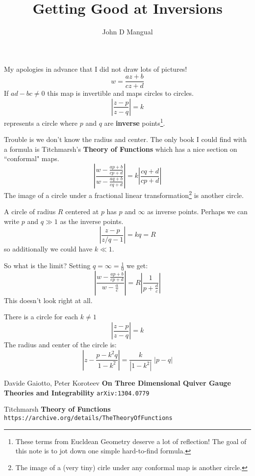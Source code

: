 \documentclass[12pt]{article}
\title{\textbf{ Getting Good at Inversions }}
\author{John D Mangual}
\date{}
\begin{document}
\selectfont \fontsize{25}{30}\selectfont

\maketitle

\noindent My apologies in advance that I did not draw lots of pictures!
$$ w = \frac{az+b}{cz+d} $$
If $ad-bc \neq 0$ this map is invertible and maps circles to circles.
$$ \left|\frac{z-p}{z-q}\right| = k $$
represents a circle where $p$ and $q$ are \textbf{inverse} points\footnote{These terms from Eucldean Geometry deserve a lot of reflection! The goal of this note is to jot down one simple hard-to-find formula.}.

\newpage

\noindent Trouble is we don't know the radius and center.  The only book I could find with a formula is Titchmarsh's \textbf{Theory of Functions} which has a nice section on ``conformal" maps. 
$$ \left| \frac{w - \frac{ap+b}{cp+d}}{w - \frac{aq+b}{cq+d}} \right| = k \left| \frac{cq + d}{cp + d} \right| $$
The image of a circle under a fractional linear transformation\footnote{The image of a (very tiny) cirle under any conformal map is another circle.} is another circle. \newline

\noindent A circle of radius $R$ centered at $p$ has $p$ and $\infty$ as inverse points.  Perhaps we can write $p$ and $q \gg 1 $ as the inverse points.
$$ \left|\frac{z-p}{z/q-1}\right| = kq= R $$
so additionally we could have $k \ll 1$.

\newpage

\noindent So what is the limit?  Setting $q = \infty = \frac{1}{0}$ we get:
$$ \left| \frac{w - \frac{ap+b}{cp+d}}{w - \frac{a}{c}} \right| = R\left| \frac{1}{p + \frac{d}{c}} \right| $$
This doesn't look right at all. \newline

\noindent There is a circle for each $k \neq 1$
$$ \left|\frac{z-p}{z-q}\right| = k $$
The radius and center of the circle is:
$$ \left|z - \frac{p - k^2 q}{1 - k^2} \right| = \frac{k}{|1 - k^2|} \; |p - q|$$

\newpage

\selectfont \fontsize{12}{10}\selectfont

\begin{thebibliography}{}

\item Davide Gaiotto, Peter Koroteev \textbf{On Three Dimensional Quiver Gauge Theories and Integrability} \texttt{arXiv:1304.0779}

\item Titchmarsh \textbf{Theory of Functions} \texttt{https://archive.org/details/TheTheoryOfFunctions}



\end{thebibliography}
\end{document}
